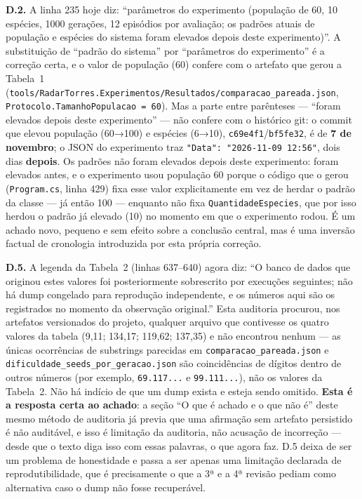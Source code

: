 \documentclass[11pt,a4paper]{article}
\begin{document}
\textbf{D.2.} A linha 235 hoje diz: ``parâmetros do experimento (população de 60, 10 espécies, 1000
gerações, 12 episódios por avaliação; os padrões atuais de população e espécies do sistema foram
elevados depois deste experimento)''. A substituição de ``padrão do sistema'' por ``parâmetros do
experimento'' é a correção certa, e o valor de população (60) confere com o artefato que gerou a
Tabela~1 (\texttt{tools/RadarTorres.Experimentos/Resultados/comparacao\_pareada.json},
\texttt{Protocolo.TamanhoPopulacao = 60}). Mas a parte entre parênteses --- ``foram elevados depois
deste experimento'' --- não confere com o histórico git: o commit que elevou população (60→100) e
espécies (6→10), \texttt{c69e4f1}/\texttt{bf5fe32}, é de \textbf{7 de novembro}; o JSON do experimento
traz \texttt{"Data": "2026-11-09 12:56"}, dois dias \textbf{depois}. Os padrões não foram elevados
depois deste experimento: foram elevados antes, e o experimento usou população 60 porque o código que
o gerou (\texttt{Program.cs}, linha 429) fixa esse valor explicitamente em vez de herdar o padrão da
classe --- já então 100 --- enquanto não fixa \texttt{QuantidadeEspecies}, que por isso herdou o
padrão já elevado (10) no momento em que o experimento rodou. É um achado novo, pequeno e sem efeito
sobre a conclusão central, mas é uma inversão factual de cronologia introduzida por esta própria
correção.

\textbf{D.5.} A legenda da Tabela~2 (linhas 637--640) agora diz: ``O banco de dados que originou estes
valores foi posteriormente sobrescrito por execuções seguintes; não há dump congelado para reprodução
independente, e os números aqui são os registrados no momento da observação original.'' Esta auditoria
procurou, nos artefatos versionados do projeto, qualquer arquivo que contivesse os quatro valores da
tabela (9,11; 134,17; 119,62; 137,35) e não encontrou nenhum --- as únicas ocorrências de substrings
parecidas em \texttt{comparacao\_pareada.json} e \texttt{dificuldade\_seeds\_por\_geracao.json} são
coincidências de dígitos dentro de outros números (por exemplo, \texttt{69.117...} e
\texttt{99.111...}), não os valores da Tabela~2. Não há indício de que um dump exista e esteja sendo
omitido. \textbf{Esta é a resposta certa ao achado}: a seção ``O que é achado e o que não é'' deste
mesmo método de auditoria já previa que uma afirmação sem artefato persistido é não auditável, e isso
é limitação da auditoria, não acusação de incorreção --- desde que o texto diga isso com essas
palavras, o que agora faz. D.5 deixa de ser um problema de honestidade e passa a ser apenas uma
limitação declarada de reprodutibilidade, que é precisamente o que a 3ª e a 4ª revisão pediam como
alternativa caso o dump não fosse recuperável.
\end{document}
